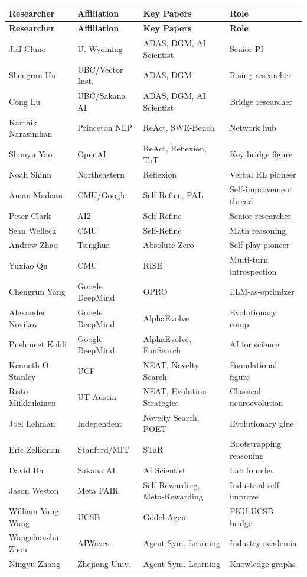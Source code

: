 \begin{longtable}{p{30mm}p{30mm}p{22mm}p{28mm}}
\toprule
\textbf{Researcher} & \textbf{Affiliation} & \textbf{Key Papers} & \textbf{Role} \\
\midrule
\endfirsthead
\toprule
\textbf{Researcher} & \textbf{Affiliation} & \textbf{Key Papers} & \textbf{Role} \\
\midrule
\endhead

Jeff Clune & U. Wyoming & ADAS, DGM, AI Scientist & Senior PI \\
Shengran Hu & UBC/Vector Inst. & ADAS, DGM & Rising researcher \\
Cong Lu & UBC/Sakana AI & ADAS, DGM, AI Scientist & Bridge researcher \\
Karthik Narasimhan & Princeton NLP & ReAct, SWE-Bench & Network hub \\
Shunyu Yao & OpenAI & ReAct, Reflexion, ToT & Key bridge figure \\
Noah Shinn & Northeastern & Reflexion & Verbal RL pioneer \\
Aman Madaan & CMU/Google & Self-Refine, PAL & Self-improvement thread \\
Peter Clark & AI2 & Self-Refine & Senior researcher \\
Sean Welleck & CMU & Self-Refine & Math reasoning \\
Andrew Zhao & Tsinghua & Absolute Zero & Self-play pioneer \\
Yuxiao Qu & CMU & RISE & Multi-turn introspection \\
Chengrun Yang & Google DeepMind & OPRO & LLM-as-optimizer \\
Alexander Novikov & Google DeepMind & AlphaEvolve & Evolutionary comp. \\
Pushmeet Kohli & Google DeepMind & AlphaEvolve, FunSearch & AI for science \\
Kenneth O. Stanley & UCF & NEAT, Novelty Search & Foundational figure \\
Risto Miikkulainen & UT Austin & NEAT, Evolution Strategies & Classical neuroevolution \\
Joel Lehman & Independent & Novelty Search, POET & Evolutionary glue \\
Eric Zelikman & Stanford/MIT & STaR & Bootstrapping reasoning \\
David Ha & Sakana AI & AI Scientist & Lab founder \\
Jason Weston & Meta FAIR & Self-Rewarding, Meta-Rewarding & Industrial self-improve \\
William Yang Wang & UCSB & G\"{o}del Agent & PKU-UCSB bridge \\
Wangchunshu Zhou & AIWaves & Agent Sym. Learning & Industry-academia \\
Ningyu Zhang & Zhejiang Univ. & Agent Sym. Learning & Knowledge graphs \\
\bottomrule
\end{longtable}


